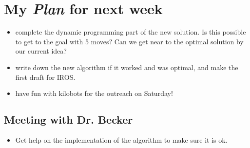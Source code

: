 \section{My \emph{Plan} for next week}

\begin{itemize}
\item complete the dynamic programming part of the new solution. Is this possible to get to the goal with 5 moves? Can we get near to the optimal solution by our current idea? 
\item write down the new algorithm if it worked and was optimal, and make the first draft for IROS.
\item have fun with kilobots for the outreach on Saturday!
\end{itemize}

\subsection{Meeting with Dr. Becker  }

\begin{itemize}
\item Get help on the implementation of the algorithm to make sure it is ok. 
\end{itemize}


